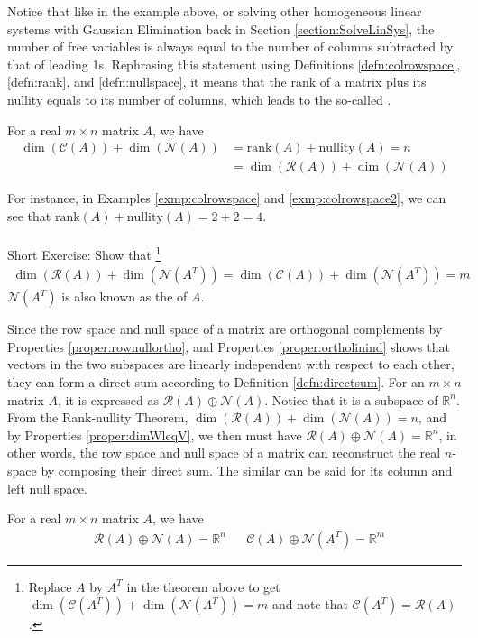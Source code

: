 Notice that like in the example above, or solving other homogeneous linear systems with Gaussian Elimination back in Section \ref{section:SolveLinSys}, the number of free variables is always equal to the number of columns subtracted by that of leading 1s. Rephrasing this statement using Definitions \ref{defn:colrowspace}, \ref{defn:rank}, and \ref{defn:nullspace}, it means that the rank of a matrix plus its nullity equals to its number of columns, which leads to the so-called .
\begin{thm}
\label{thm:ranknullity}
For a real $m \times n$ matrix $A$, we have
\begin{align*}
\dim(\mathcal{C}(A)) + \dim(\mathcal{N}(A)) &= \text{rank}(A) + \text{nullity}(A) = n \\
&= \dim(\mathcal{R}(A)) + \dim(\mathcal{N}(A))
\end{align*}
\end{thm}
For instance, in Examples \ref{exmp:colrowspace} and  \ref{exmp:colrowspace2}, we can see that $\text{rank}(A) + \text{nullity}(A) = 2+2 = 4$.\\
\\
Short Exercise: Show that \footnote{Replace $A$ by $A^T$ in the theorem above to get $\dim(\mathcal{C}(A^T)) + \dim(\mathcal{N}(A^T)) = m$ and note that $\mathcal{C}(A^T) = \mathcal{R}(A)$.}
\begin{align*}
\dim(\mathcal{R}(A)) + \dim(\mathcal{N}(A^T)) = \dim(\mathcal{C}(A)) + \dim(\mathcal{N}(A^T)) = m   
\end{align*} $\mathcal{N}(A^T)$ is also known as the  of $A$.

Since the row space and null space of a matrix are orthogonal complements by Properties \ref{proper:rownullortho}, and Properties \ref{proper:ortholinind} shows that vectors in the two subspaces are linearly independent with respect to each other, they can form a direct sum according to Definition \ref{defn:directsum}. For an $m \times n$ matrix $A$, it is expressed as $\mathcal{R}(A) \oplus \mathcal{N}(A)$. Notice that it is a subspace of $\mathbb{R}^n$. From the Rank-nullity Theorem, $\dim(\mathcal{R}(A)) + \dim(\mathcal{N}(A)) = n$, and by Properties \ref{proper:dimWleqV}, we then must have $\mathcal{R}(A) \oplus \mathcal{N}(A) = \mathbb{R}^n$, in other words, the row space and null space of a matrix can reconstruct the real $n$-space by composing their direct sum. The similar can be said for its column and left null space.
\begin{proper}
\label{proper:funsubsortho}
For a real $m \times n$ matrix $A$, we have
\begin{align*}
& \mathcal{R}(A) \oplus \mathcal{N}(A) = \mathbb{R}^n & & \mathcal{C}(A) \oplus \mathcal{N}(A^T) = \mathbb{R}^m
\end{align*}
\end{proper}

